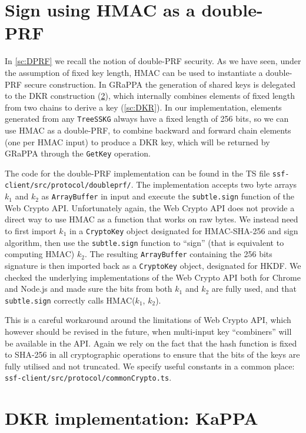 \section{Sign using HMAC as a double-PRF}\label{sc:ssf-double-prf}
In \cref{sc:DPRF} we recall the notion of double-PRF security.
As we have seen, under the assumption of fixed key length, HMAC 
can be used to instantiate a double-PRF secure construction.
In GRaPPA the generation of shared keys is delegated to the
DKR construction (\cref{sc:DKR-implementation}), which 
internally combines elements of fixed
length from two chains to derive a key (\cref{sc:DKR}).
In our implementation, elements generated from any \texttt{TreeSSKG}
always have a fixed length of 256 bits, so we can use HMAC as a
double-PRF, to 
combine backward and forward chain elements 
(one per HMAC input) to
produce a DKR key, which will be returned by GRaPPA through
the \texttt{GetKey} operation.

The code for the double-PRF implementation can be found in the TS file {\texttt{ssf-client/src/protocol/doubleprf/}}.
The implementation accepts two byte arrays $k_1$ and $k_2$ 
as \texttt{ArrayBuffer} in input and execute the {\texttt{subtle.sign}} 
function of the Web Crypto API. 
Unfortunately again, the Web Crypto API does not provide a direct way to
use HMAC as a function that works on raw bytes. We instead
need to first import $k_1$ in a \texttt{CryptoKey} object
designated for HMAC-SHA-256 and sign algorithm,
then use the \texttt{subtle.sign} function to ``sign''
(that is equivalent to computing HMAC) $k_2$.
The resulting \texttt{ArrayBuffer} containing the
256 bits signature is then imported back as
a \texttt{CryptoKey} object, designated for HKDF.
We checked the underlying implementations of the Web Crypto API
both for Chrome and Node.js and made sure the bits
from both $k_1$ and $k_2$ are fully used, and that
\texttt{subtle.sign} correctly calls HMAC($k_1$, $k_2$).

This is a careful workaround around the limitations
of Web Crypto API, which however should be revised
in the future, when multi-input key ``combiners''
will be available in the API.
Again we rely on the fact that the hash function is
fixed to SHA-256 in all cryptographic operations
to ensure that the bits of the keys are fully utilised
and not truncated. We specify useful constants
in a common place: \texttt{ssf-client/src/protocol/commonCrypto.ts}.

\section{DKR implementation: KaPPA}\label{sc:DKR-implementation}

